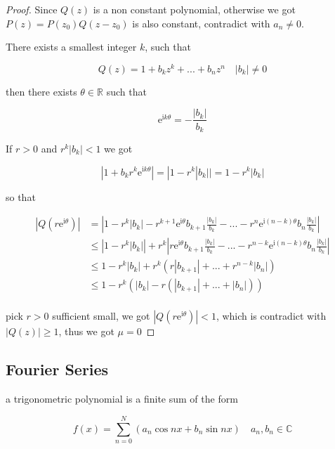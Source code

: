 \begin{proof}
    Since $Q(z)$ is a non constant polynomial, otherwise we got $P(z) = P(z_0) Q(z-z_0)$ is also constant, contradict with $a_n \ne 0$.

    There exists a smallest integer $k$, such that

    \[
        Q(z) = 1+ b_kz^k +... + b_nz^n \quad |b_k| \ne 0
    \]

    then there exists $\theta \in \mathbb{R}$ such that

    \[
        \mathrm{e}^{\mathrm{i} k\theta} = - \frac{|b_k|}{b_k}
    \]

    If $r > 0$  and $r^k| b_k| < 1$ we got

    \[
        |1 + b_kr^k \mathrm{e}^{\mathrm{i} k\theta} | = |1 - r^k |b_k| | = 1 - r^k |b_k|
    \]

    so that

    \begin{align*}
        \left| Q(r \mathrm{e}^{\mathrm{i} \theta}) \right| &= \left| 1-r^k|b_k| -r^{k+1} \mathrm{e}^{\mathrm{i} \theta} b_{k+1}\frac{|b_k|}{b_k} - ... - r^{n} \mathrm{e}^{\mathrm{i} (n-k)\theta} b_{n}\frac{|b_k|}{b_k} \right| \\ 
        & \le \left| 1-r^k|b_k| \right| + r^k\left| r \mathrm{e}^{\mathrm{i} \theta} b_{k+1}\frac{|b_k|}{b_k} - ... - r^{n-k} \mathrm{e}^{\mathrm{i} (n-k)\theta} b_{n}\frac{|b_k|}{b_k} \right| \\
        & \le 1-r^k|b_k| +r^k\left( r|b_{k+1}| + ... + r^{n-k}|b_n| \right) \\
        & \le 1 - r^k\left( |b_k| - r \left(|b_{k+1}| + ... + |b_n| \right) \right) \\
    \end{align*}

    pick $r > 0$ sufficient small, we  got $|Q(r\mathrm{e}^{\mathrm{i} \theta})| < 1$,
    which is contradict with $|Q(z)| \ge 1$, thus we got $\mu = 0$

\end{proof}

\subsection{Fourier Series}

\begin{definition}
    a trigonometric polynomial is a finite sum of the form

    \[
        f(x) = \sum_{n=0}^{N}\left(a_n \cos nx + b_n \sin nx \right) \quad a_n,b_n \in \mathbb{C}
    \]
\end{definition}

